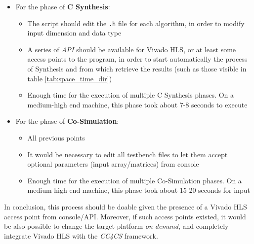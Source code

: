 \begin{itemize}
	\item For the phase of \textbf{C Synthesis}:
	\begin{itemize}
		\item The script should edit the \texttt{.h} file for each algorithm, in order to modify input dimension and data type
		\item A series of \emph{API} should be available for Vivado HLS, or at least some access points to the program, in order to start automatically the process of Synthesis and from which retrieve the results (such as those visible in table \ref{tab:space_time_dir})
		\item Enough time for the execution of multiple C Synthesis phases. On a medium-high end machine, this phase took about 7-8 seconds to execute
	\end{itemize}
	\item For the phase of \textbf{Co-Simulation}:
	\begin{itemize}
		\item All previous points
		\item It would be necessary to edit all testbench files to let them accept optional parameters (input array/matrices) from console
		\item Enough time for the execution of multiple Co-Simulation phases. On a medium-high end machine, this phase took about 15-20 seconds for input
	\end{itemize}
\end{itemize}

In conclusion, this process should be doable given the presence of a Vivado HLS access point from console/API. Moreover, if such access points existed, it would be also possible to change the target platform \textit{on demand}, and completely integrate Vivado HLS with the \textit{CC4CS} framework.